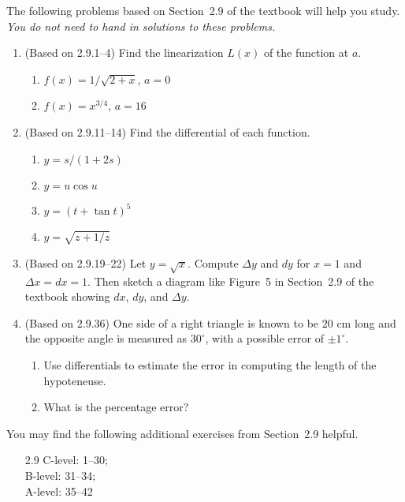 \documentclass{article}
\title{\commonPSTitleZeroTwoNine}
\author{\commonAuthor}
\date{\commonDateZeroTwoNine}
\begin{document}
\maketitle
\thispagestyle{empty}

\noindent
The following problems based on Section~2.9 of the textbook will help
you study.  \emph{You do not need to hand in solutions to these
  problems.}
\begin{enumerate}
\item (Based on 2.9.1--4) %
  Find the linearization $L(x)$ of the function at
  $a$.
  \begin{multicols}{2}
  \begin{enumerate}
  \item $f(x)=1/\sqrt{2+x}$, $a=0$
  \item $f(x)=x^{3/4}$, $a=16$
  \end{enumerate}
  \end{multicols}
\item (Based on 2.9.11--14) %
  Find the differential of each function.
  \begin{multicols}{4}
  \begin{enumerate}
  \item $y=s/(1+2s)$
  \item $y=u\cos u$
  \item $y=(t+\tan t)^5$
  \item $y=\sqrt{z+1/z}$
  \end{enumerate}
  \end{multicols}
\item (Based on 2.9.19--22) %
  Let $y=\sqrt{x}$.  Compute $\Delta y$ and $dy$ for 
  $x=1$ and $\Delta x=dx=1$.  Then sketch a diagram like Figure~5 in
  Section~2.9 of the textbook showing $dx$, $dy$, and $\Delta y$.
\item (Based on 2.9.36) %
  One side of a right triangle is known to be 
  $20$ cm long and the opposite angle is measured as $30^\circ$, with
  a possible error of $\pm 1^\circ$.
  \begin{enumerate}
  \item Use differentials to estimate the error in computing the length
    of the hypoteneuse.
  \item What is the percentage error?
  \end{enumerate}
\end{enumerate}

\noindent
You may find the following additional exercises from Section~2.9 helpful.
\begin{itemize}
\item[2.9] C-level: 1--30; \\
  B-level: 31--34; \\
  A-level: 35--42
\end{itemize}
\end{document}
